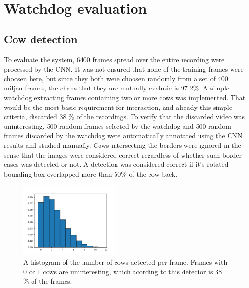 \documentclass{cta-author}
\begin{document}
\section{Watchdog evaluation}
\subsection{Cow detection}
\label{sec:num}
To evaluate the system, 6400 frames spread over the entire recording were processed by the CNN. 
It was not ensured that none of the training frames were choosen here, but since they both were choosen 
randomly from a set of 400 miljon frames, the chans that they are mutually exclusie is 97.2\%.
A simple watchdog extracting frames containing two or more cows was implemented. That would be the most basic 
requirement for interaction, and already this simple criteria, discarded 38 \% of the recordings. To 
verify that the discarded video was uninteresting, 500 random frames selected by the watchdog and 500 random 
frames discarded by the watchdog were automatically annotated using the CNN results and studied manually. 
Cows intersecting the borders were ignored in the sense that the images were considered correct regardless of 
whether such border cases was detected or not. A detection was considered correct if it's rotated bounding 
box overlapped more than 50\% of the cow back.

\begin{figure}[tb]
\begin{center}
  \includegraphics[width=0.45\textwidth]{cow_nbr_hist.pdf}
\end{center}
  \caption{A histogram of the number of cows detected per frame. Frames with $0$ or $1$ cows are 
uninteresting, which acording to this detector is 38 \% of the frames.}
  \label{fig:cowhist}
\end{figure}
\end{document}
